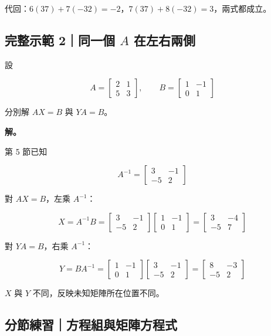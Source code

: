 \documentclass[11pt,a4paper]{article}
\begin{document}
代回：\(6(37)+7(-32)=-2\)，\(7(37)+8(-32)=3\)，兩式都成立。

\subsection{\texorpdfstring{完整示範 2｜同一個 \(A\) 在左右兩側}{完整示範 2｜同一個 A 在左右兩側}}\label{ux5b8cux6574ux793aux7bc4-2ux540cux4e00ux500b-a-ux5728ux5de6ux53f3ux5169ux5074}

設

\[
A=\begin{bmatrix}2&1\\5&3\end{bmatrix},
\qquad
B=\begin{bmatrix}1&-1\\0&1\end{bmatrix}
\]

分別解 \(AX=B\) 與 \(YA=B\)。

\textbf{解。}

第 5 節已知

\[
A^{-1}=\begin{bmatrix}3&-1\\-5&2\end{bmatrix}
\]

對 \(AX=B\)，左乘 \(A^{-1}\)：

\[
X=A^{-1}B
=\begin{bmatrix}3&-1\\-5&2\end{bmatrix}
\begin{bmatrix}1&-1\\0&1\end{bmatrix}
=\begin{bmatrix}3&-4\\-5&7\end{bmatrix}
\]

對 \(YA=B\)，右乘 \(A^{-1}\)：

\[
Y=BA^{-1}
=\begin{bmatrix}1&-1\\0&1\end{bmatrix}
\begin{bmatrix}3&-1\\-5&2\end{bmatrix}
=\begin{bmatrix}8&-3\\-5&2\end{bmatrix}
\]

\(X\) 與 \(Y\) 不同，反映未知矩陣所在位置不同。

\subsection{分節練習｜方程組與矩陣方程式}\label{ux5206ux7bc0ux7df4ux7fd2ux65b9ux7a0bux7d44ux8207ux77e9ux9663ux65b9ux7a0bux5f0f}
\end{document}
